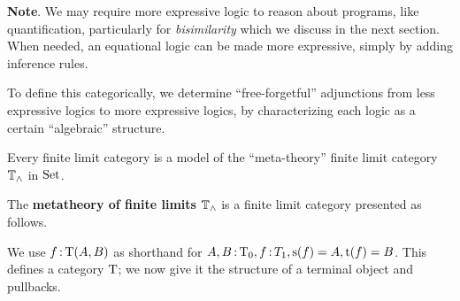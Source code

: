 \documentclass{article}
\begin{document}
\vspace{1em}

\textbf{Note}. We may require more expressive logic to reason about programs, like quantification, particularly for \textit{bisimilarity} which we discuss in the next section. When needed, an equational logic can be made more expressive, simply by adding inference rules.

To define this categorically, we determine ``free-forgetful'' adjunctions from less expressive logics to more expressive logics, by characterizing each logic as a certain ``algebraic'' structure.

Every finite limit category is a model of the ``meta-theory'' finite limit category $\mathbb{T}_\land$ in $\mathrm{Set}$.

\begin{definition}
    The \textbf{metatheory of finite limits} $\mathbb{T}_\land$ is a finite limit category presented as follows.

    We use $f\,{:}\, \mathrm{T}(A,B)$ as shorthand for $A,B\,{:}\, \mathrm{T}_0, f\,{:}\, T_1, \mathrm{s}(f)=A, \mathrm{t}(f) = B$.
    This defines a category $\mathrm{T}$; we now give it the structure of a terminal object and pullbacks.
\end{definition}
\end{document}
